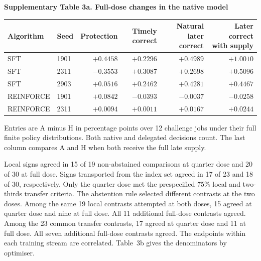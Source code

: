 \documentclass[11pt,a4paper]{article}
\newcommand{\tabhead}[2]{\par\Needspace{11\baselineskip}\smallskip\noindent\textbf{Supplementary Table #1. #2}\par\nobreak\smallskip}
\begin{document}
\tabhead{3a}{Full-dose changes in the native model}
\begin{center}\small
\begin{tabular}{@{}llrrrr@{}}
\toprule
Algorithm & Seed & Protection & Timely correct & Natural later correct & Later correct with supply\\
\midrule
SFT & 1901 & $+0.4458$ & $+0.2296$ & $+0.4989$ & $+1.0010$\\
SFT & 2311 & $-0.3553$ & $+0.3087$ & $+0.2698$ & $+0.5096$\\
SFT & 2903 & $+0.0516$ & $+0.2462$ & $+0.4281$ & $+0.4467$\\
REINFORCE & 1901 & $+0.0842$ & $-0.0393$ & $-0.0037$ & $-0.0258$\\
REINFORCE & 2311 & $+0.0094$ & $+0.0011$ & $+0.0167$ & $+0.0244$\\
\bottomrule
\end{tabular}
\end{center}
Entries are A minus H in percentage points over 12 challenge jobs under their full finite policy distributions. Both native and delegated decisions count. The last column compares A and H when both receive the full late supply.

Local signs agreed in 15 of 19 non-abstained comparisons at quarter dose and 20 of 30 at full dose. Signs transported from the index set agreed in 17 of 23 and 18 of 30, respectively. Only the quarter dose met the prespecified 75\% local and two-thirds transfer criteria. The abstention rule selected different contrasts at the two doses. Among the same 19 local contrasts attempted at both doses, 15 agreed at quarter dose and nine at full dose. All 11 additional full-dose contrasts agreed. Among the 23 common transfer contrasts, 17 agreed at quarter dose and 11 at full dose. All seven additional full-dose contrasts agreed. The endpoints within each training stream are correlated. Table~3b gives the denominators by optimiser.
\end{document}
